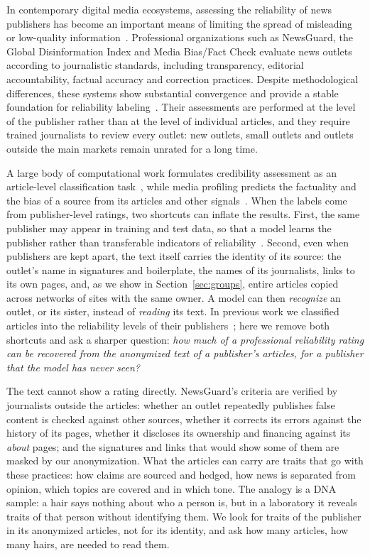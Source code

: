 \documentclass[11pt,a4paper]{article}
\begin{document}
In contemporary digital media ecosystems, assessing the reliability of news publishers has become an important means
of limiting the spread of misleading or low-quality information~\cite{Bowman2003,Jemielniak2020}. Professional
organizations such as NewsGuard, the Global Disinformation Index and Media Bias/Fact Check evaluate news outlets
according to journalistic standards, including transparency, editorial accountability, factual accuracy and correction
practices. Despite methodological differences, these systems show substantial convergence and provide a stable
foundation for reliability labeling~\cite{lin2023high,DBLP:conf/icwsm/PratelliP22}. Their assessments are performed at
the level of the publisher rather than at the level of individual articles, and they require trained journalists to
review every outlet: new outlets, small outlets and outlets outside the main markets remain unrated for a long time.

A large body of computational work formulates credibility assessment as an article-level classification
task~\cite{pandolfi2020automatic,Przybyla2021plugin,10.1145/3770077,DBLP:journals/dbsk/AdjiLS26}, while media profiling
predicts the factuality and the bias of a source from its articles and other signals~\cite{baly2018predicting,
baly2020written,nakov2024survey}. When the labels come from publisher-level ratings, two shortcuts can inflate the
results. First, the same publisher may appear in training and test data, so that a model learns the publisher rather
than transferable indicators of reliability~\cite{zhou2021hidden,azizov-etal-2024-safari,verhoeven2025yesterday}.
Second, even when publishers are kept apart, the text itself carries the identity of its source: the outlet's name in
signatures and boilerplate, the names of its journalists, links to its own pages, and, as we show in
Section~\ref{sec:groups}, entire articles copied across networks of sites with the same owner. A model can then
\emph{recognize} an outlet, or its sister, instead of \emph{reading} its text. In previous work we classified articles
into the reliability levels of their publishers~\cite{Bianchi2024SAC}; here we remove both shortcuts and ask a sharper
question: \emph{how much of a professional reliability
rating can be recovered from the anonymized text of a publisher's articles, for a publisher that the model has never
seen?}

The text cannot show a rating directly. NewsGuard's criteria are verified by journalists outside the articles: whether
an outlet repeatedly publishes false content is checked against other sources, whether it corrects its errors against
the history of its pages, whether it discloses its ownership and financing against its \emph{about} pages; and the
signatures and links that would show some of them are masked by our anonymization. What the articles can carry are
traits that go with these practices: how claims are sourced and hedged, how news is separated from opinion, which topics
are covered and in which tone. The analogy is a DNA sample: a hair says nothing about who a person is, but in a laboratory
it reveals traits of that person without identifying them. We look for traits of the publisher in its anonymized
articles, not for its identity, and ask how many articles, how many hairs, are needed to read them.
\end{document}
